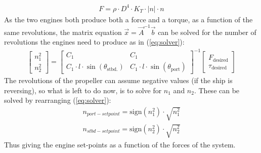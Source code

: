 \documentclass[journal]{IEEEtran}
\begin{document}
\begin{align}
F = \rho \cdot D^4 \cdot K_T \cdot |n| \cdot n
\label{eq:soren}
\end{align}
As the two engines both produce both a force and a torque, as a function of the same revolutions, the matrix equation $\vec{x} = \vec{A}^{-1}\vec{b}$ can be solved for the number of revolutions the engines need to produce as in (\ref{eq:solver}):
\begin{align}
\begin{bmatrix}
n_1^2\\
n_2^2
\end{bmatrix} = \begin{bmatrix}
C_1 & C_1\\
C_1 \cdot l \cdot \sin(\theta_\text{stbd.}) & C_1 \cdot l \cdot \sin(\theta_\text{port})
\end{bmatrix}^{-1}\begin{bmatrix}
F_\text{desired}\\
\tau_\text{desired}
\end{bmatrix}\label{eq:solver}
\end{align}
The revolutions of the propeller can assume negative values (if the ship is reversing), so what is left to do now, is to solve for $n_1$ and $n_2$. These can be solved by rearranging (\ref{eq:solver}):
\begin{align}
n_{port-setpoint} = \text{sign}(n_1^2) \cdot \sqrt{n_1^2}\\
n_{stbd-setpoint} = \text{sign}(n_2^2) \cdot \sqrt{n_2^2}
\end{align}
Thus giving the engine set-points as a function of the forces of the system.
\end{document}
